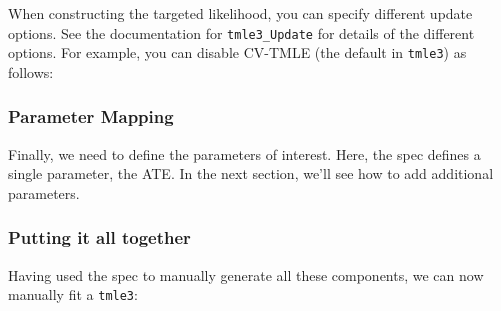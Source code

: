\documentclass[12pt, krantz2,]{krantz}
\newenvironment{Shaded}{\begin{snugshade}}{\end{snugshade}}
\newcommand{\DataTypeTok}[1]{\textcolor[rgb]{0.27,0.27,0.27}{#1}}
\newcommand{\DecValTok}[1]{\textcolor[rgb]{0.06,0.06,0.06}{#1}}
\newcommand{\KeywordTok}[1]{\textcolor[rgb]{0.27,0.27,0.27}{\textbf{#1}}}
\newcommand{\NormalTok}[1]{#1}
\newcommand{\OperatorTok}[1]{\textcolor[rgb]{0.43,0.43,0.43}{\textbf{#1}}}
\newcommand{\OtherTok}[1]{\textcolor[rgb]{0.37,0.37,0.37}{#1}}
\newcommand{\StringTok}[1]{\textcolor[rgb]{0.5,0.5,0.5}{#1}}
\theoremstyle{definition}
\theoremstyle{definition}
\theoremstyle{definition}
\newcommand{\1}{\mathbbm{1}}
\begin{document}
When constructing the targeted likelihood, you can specify different update
options. See the documentation for \texttt{tmle3\_Update} for details of the different
options. For example, you can disable CV-TMLE (the default in \texttt{tmle3}) as
follows:

\begin{Shaded}
\end{Shaded}

\hypertarget{parameter-mapping}{%
\subsubsection{Parameter Mapping}\label{parameter-mapping}}

Finally, we need to define the parameters of interest. Here, the spec defines a
single parameter, the ATE. In the next section, we'll see how to add additional
parameters.

\begin{Shaded}
\end{Shaded}

\hypertarget{putting-it-all-together}{%
\subsubsection{Putting it all together}\label{putting-it-all-together}}

Having used the spec to manually generate all these components, we can now
manually fit a \texttt{tmle3}:
\end{document}
